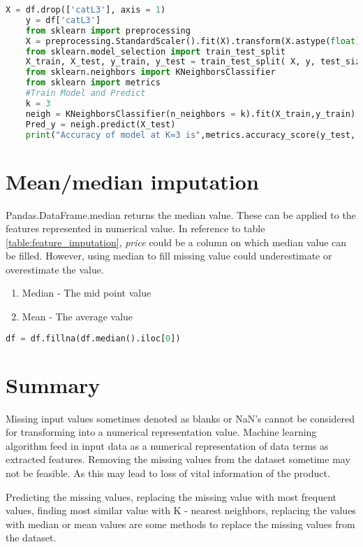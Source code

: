 \begin{lstlisting}[language=Python]
    X = df.drop(['catL3'], axis = 1)
    y = df['catL3']
    from sklearn import preprocessing
    X = preprocessing.StandardScaler().fit(X).transform(X.astype(float))
    from sklearn.model_selection import train_test_split
    X_train, X_test, y_train, y_test = train_test_split( X, y, test_size=0.2, random_state=4)
    from sklearn.neighbors import KNeighborsClassifier
    from sklearn import metrics
    #Train Model and Predict
    k = 3  
    neigh = KNeighborsClassifier(n_neighbors = k).fit(X_train,y_train)
    Pred_y = neigh.predict(X_test)
    print("Accuracy of model at K=3 is",metrics.accuracy_score(y_test, Pred_y))
\end{lstlisting}



\section{Mean/median imputation}

Pandas.DataFrame.median \parencite{mckinney-proc-scipy-2010} returns the median value. These can be applied to the features represented in numerical value. In reference to table \ref{table:feature_imputation}, \textit{price} could be a column on which median value can be filled. However, using median to fill missing value could underestimate or overestimate the value.

\begin{enumerate}
    \item Median - The mid point value
    \item Mean - The average value
\end{enumerate}

\begin{lstlisting}[language=Python]
    df = df.fillna(df.median().iloc[0])
\end{lstlisting}

\section{Summary}

Missing input values sometimes denoted as blanks or NaN's cannot be considered for transforming into a numerical representation value. Machine learning algorithm feed in input data as a numerical representation of data terms as extracted features. Removing the missing values from the dataset sometime may not be feasible. As this may lead to loss of vital information of the product. 

Predicting the missing values, replacing the missing value with most frequent values, finding most similar value with K - nearest neighbors, replacing the values with median or mean values are some methods to replace the missing values from the dataset. 